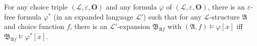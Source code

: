 For any choice triple $(\mathcal{L}, \varepsilon, \mathbf{O})$ and any formula $\varphi$ of $(\mathcal{L}, \varepsilon, \mathbf{O})$, there is an $\varepsilon$-free formula $\varphi^*$ (in an expanded language $\mathcal{L}'$) such that for any $\mathcal{L}$-structure $\mathfrak{A}$ and choice function $f$, there is an $\mathcal{L}'$-expansion $\mathfrak{B}_{\mathfrak{A}f}$ with $(\mathfrak{A}, f) \models \varphi[x]$ iff $\mathfrak{B}_{\mathfrak{A}f} \models \varphi^*[x]$.
